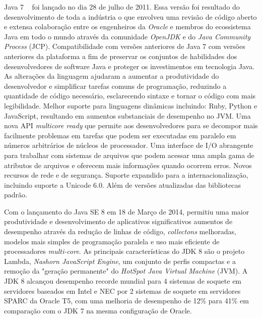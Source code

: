 Java 7 ~\cite{JSE7} foi lançado no dia 28 de julho de 2011. Essa vers\~{a}o foi resultado do desenvolvimento de toda a ind\'{u}stria o que envolveu uma revis\~{a}o de c\'{o}digo aberto e extensa colaboraç\~{a}o entre os engenheiros da {\it Oracle} e membros do ecossistema Java em todo o mundo atrav\'{e}s da comunidade {\it OpenJDK} e do {\it Java Community Process} (\acs{JCP}). Compatibilidade com vers\~{o}es anteriores de Java 7 com vers\~{o}es anteriores da plataforma a fim de preservar os conjuntos de habilidades dos desenvolvedores de software Java e proteger os investimentos em tecnologia Java. As alteraç\~{o}es da linguagem ajudaram a aumentar a produtividade do desenvolvedor e simplificar tarefas comuns de programaç\~{a}o, reduzindo a quantidade de c\'{o}digo necess\'{a}rio, esclarecendo sintaxe e tornar o c\'{o}digo com mais legibilidade. Melhor suporte para linguagens din\^{a}micas incluindo: Ruby, Python e JavaScript, resultando em aumentos substanciais de desempenho no \acs{JVM}. Uma nova API {\it multicore ready} que permite aos desenvolvedores para se decompor mais facilmente problemas em tarefas que podem ser executadas em paralelo em n\'{u}meros arbitr\'{a}rios de n\'{u}cleos de processador. Uma interface de I/O abrangente para trabalhar com sistemas de arquivos que podem acessar uma ampla gama de atributos de arquivos e oferecem mais informaç\~{o}es quando ocorrem erros. Novos recursos de rede e de segurança. Suporte expandido para a internacionalizaç\~{a}o, incluindo suporte a Unicode 6.0. Al\'{e}m de vers\~{o}es atualizadas das bibliotecas padr\~{a}o.

Com o lançamento do Java SE 8 em 18 de Março de 2014, permitiu uma maior produtividade e desenvolvimento de aplicativos significativos aumentos de desempenho atrav\'{e}s da reduç\~{a}o de linhas de c\'{o}digo, {\it collectons} melhoradas, modelos mais simples de programaç\~{a}o paralela e uso mais eficiente de processadores {\it multi-core}. As principais caracter\'{i}sticas do \acs{JDK} 8 s\~{a}o o projeto Lambda, {\it Nashorn JavaScript Engine}, um conjunto de perfis compactas e a remoç\~{a}o da "geraç\~{a}o permanente" do {\it HotSpot Java Virtual Machine} (\acs{JVM}). A \acs{JDK} 8 alcançou desempenho recorde mundial para 4 sistemas de soquete em servidores baseados em Intel e NEC por 2 sistemas de soquete em servidores SPARC da Oracle T5, com uma melhoria de desempenho de 12\% para 41\% em comparaç\~{a}o com o JDK 7 na mesma configuraç\~{a}o de Oracle.

